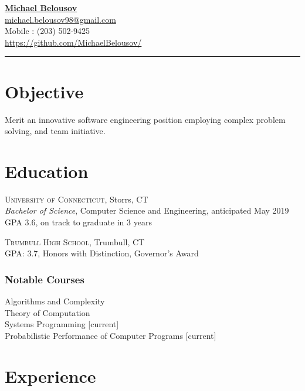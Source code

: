 \documentclass[Letterpaper,11pt]{article}
\begin{document}
\setlength{\parindent}{0em}
\setlength{\parskip}{1em}
\setlength{\parsep}{1em}
\setlength{\itemsep}{0.2em}
\setlength{\headsep}{0.2em}
\setlength{\topskip}{0.2em}
\setlength{\topmargin}{0.2em}
\setlength{\topsep}{0.2em}
\setlength{\partopsep}{0.2em}
\setlength{\columnsep}{1em}

\addtolength{\topmargin}{-2em}

\textbf{\href{mailto:michael.belousov98@gmail.com}{\Large Michael Belousov}}\\ 
\href{mailto:michael.belousov98@gmail.com}{michael.belousov98@gmail.com}\\  
Mobile : (203) 502-9425\\
\href{https://github.com/MichaelBelousov/}{https://github.com/MichaelBelousov/}\\  
\hrule

\section*{Objective}

Merit an innovative software engineering position employing complex problem solving, and team initiative.

\section*{Education}
    
    \textsc{University of Connecticut}, Storrs, CT\\
    \textit{Bachelor of Science}, Computer Science and Engineering, anticipated May 2019\\
    GPA 3.6, on track to graduate in 3 years

    \textsc{Trumbull High School}, Trumbull, CT\\
    GPA: 3.7, Honors with Distinction, Governor's Award

    \subsubsection*{Notable Courses}
    Algorithms and Complexity\\
    Theory of Computation\\
    Systems Programming [current]\\
    Probabilistic Performance of Computer Programs [current]

\section*{Experience}
\end{document}
